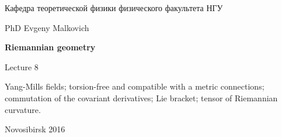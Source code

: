 \documentclass[12pt,pagesize,paper=192mm:108mm]{scrbook}
\begin{document}
\begin{titlepage}
\begin{center}
    Кафедра теоретической физики физического факультета НГУ
    \medskip

    \Large
    PhD Evgeny Malkovich

    \huge
    \textbf{Riemannian geometry}
    \smallskip

    \Large
    Lecture 8
    \vfill

    \normalsize
    \begin{minipage}{0.65\linewidth}
      Yang-Mills fields; torsion-free and compatible with a metric
      connections; commutation of the covariant derivatives; Lie
      bracket; tensor of Riemannian curvature.  
    \end{minipage} 
    \vfill

    \normalsize \ccbysa\hspace{0.5em}  Novosibirsk 2016
  \end{center}
\end{titlepage}
\end{document}
